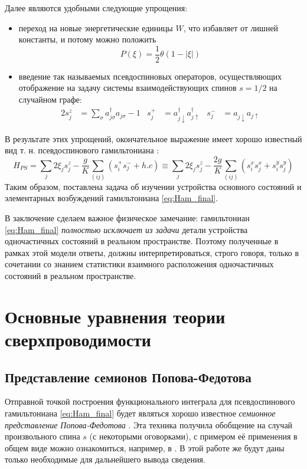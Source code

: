 Далее являются удобными следующие упрощения:
\begin{itemize}
	\item переход на новые энергетические единицы $W$, что избавляет от лишней константы, и потому можно положить
	$$
	P(\xi) = \frac{1}{2}\theta(1 - |\xi|)
	$$
	\item введение так называемых псевдоспиновых операторов, осуществляющих отображение на задачу системы взаимодействующих спинов $s = 1/2$ на случайном графе:
	\begin{align}
	\label{pseudospin_op}
		2s^z_j & = \sum_\sigma a_{j\sigma}^\dagger a_{j\sigma} - 1 &
		s^+_j & = a_{j\downarrow}^\dagger a_{j\uparrow}^\dagger &
		s^-_j & = a_{j\downarrow} a_{j\uparrow}
	\end{align}
\end{itemize}
В результате этих упрощений, окончательное выражение имеет хорошо известный вид т. н. псевдоспинового гамильтониана \cite{Ma_Lee_1985}:
\begin{equation}
\label{eq:Ham_final}
H_{PS} = \sum_{j} 2 \xi_j s_j^z - \frac{g}{K} \sum_{(ij)} (s_i^+ s_j^- + h.c) \equiv \sum_{j} 2 \xi_j s_j^z - \frac{2g}{K} \sum_{(ij)} (s_i^x s_j^x + s_i^y s_j^y)
\end{equation}
Таким образом, поставлена задача об изучении устройства основного состояний и элементарных возбуждений гамильтониана \eqref{eq:Ham_final}.

В заключение сделаем важное физическое замечание: гамильтониан \eqref{eq:Ham_final} \textit{полностью исключает из задачи} детали устройства одночастичных состояний в реальном пространстве. Поэтому полученные в рамках этой модели ответы, должны интерпретироваться, строго говоря, только в сочетании со знанием статистики взаимного расположения одночастичных состояний в реальном пространстве.



\section{Основные уравнения теории сверхпроводимости}
\subsection{Представление семионов Попова-Федотова}
Отправной точкой построения функционального интеграла для псевдоспинового гамильтониана \eqref{eq:Ham_final} будет являться хорошо известное \textit{семионное представление Попова-Федотова} \cite{Popov_Fedotov}. 
Эта техника получила обобщение на случай произвольного спина $s$ (с некоторыми оговорками), с примером её применения в общем виде можно ознакомиться, например, в \cite{Veits_etal_1994}. В этой работе же будут даны только необходимые для дальнейшего вывода сведения.

